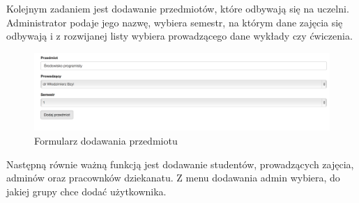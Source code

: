\documentclass{xmgr}
\begin{document}
Kolejnym zadaniem jest dodawanie przedmiotów, które odbywają się na uczelni. Administrator podaje jego nazwę, wybiera semestr, na którym dane zajęcia się odbywają i z rozwijanej listy wybiera prowadzącego dane wykłady czy ćwiczenia.

\begin{figure}[th!]
\centering
\includegraphics[width=1.1\hsize]{images/addSubject} 
\caption{Formularz dodawania przedmiotu\label{RYS.6}}
\end{figure}

Następną równie ważną funkcją jest dodawanie studentów, prowadzących zajęcia, adminów oraz pracownków dziekanatu. Z menu dodawania admin wybiera, do jakiej grupy chce dodać użytkownika.
\end{document}
